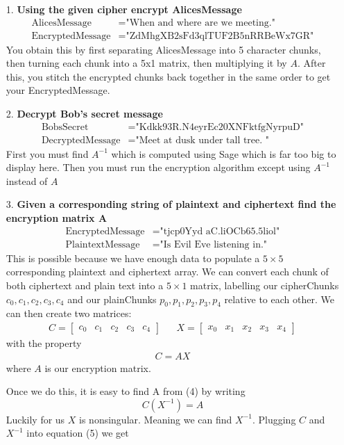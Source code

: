 \documentclass[12pt,letterpaper]{article}
\begin{document}
\begin{itemize}
    \item [1.] \textbf{Using the given cipher encrypt AlicesMessage}
    \begin{align*}
        \text{AlicesMessage} &= \text{"When and where are we meeting."}\\
        \text{EncryptedMessage} &= \text{"ZdMhgXB2sFd3qlTUF2B5nRRBeWx7GR"}
    \end{align*}
        You obtain this by first separating AlicesMessage into 5 character chunks, then turning each chunk into a 5x1 matrix, then multiplying it by $A$. After this, you stitch the encrypted chunks back together in the same order to get your EncryptedMessage.
    \item [2.] \textbf{Decrypt Bob's secret message}
        \begin{align*}
            \text{BobsSecret} &= \text{"Kdkk93R.N4eyrEc20XNFktfgNyrpuD"}\\
        \text{DecryptedMessage} &= \text{"Meet at dusk under tall tree. "}
        \end{align*}
        First you must find $A^{-1}$ which is computed using Sage which is far too big to display here. Then you must run the encryption algorithm except using $A^{-1}$ instead of $A$
         
        
    \item [3.] \textbf{Given a corresponding string of plaintext and ciphertext find the encryption matrix A}
        \begin{align*}
            \text{EncryptedMessage} &= \text{"tjcp0Yyd aC.liOCb65.5liol"}\\
            \text{PlaintextMessage} &= \text{"Is Evil Eve listening in."}
        \end{align*}
        This is possible because we have enough data to populate a $5\times 5$ corresponding plaintext and ciphertext array. We can convert each chunk of both ciphertext and plain text into a $5\times 1$ matrix, labelling our cipherChunks $c_0,c_1,c_2,c_3,c_4$ and our plainChunks $p_0,p_1,p_2,p_3,p_4$ relative to each other. We can then create two matrices:
        \begin{align*}
            C =
            \begin{bmatrix}
                c_0 & c_1 & c_2 & c_3 & c_4
            \end{bmatrix}
            && X = 
            \begin{bmatrix}
                x_0 & x_1 & x_2 & x_3 & x_4
            \end{bmatrix}
        \end{align*}
        with the property \cite{Apostols,Crypto}
        \begin{align}
            C = AX
        \end{align}
        where $A$ is our encryption matrix.
        
        Once we do this, it is easy to find A from (4) by writing
        \begin{equation}
            C(X^{-1})=A
        \end{equation}
        Luckily for us $X$ is nonsingular. Meaning we can find $X^{-1}$. Plugging $C$ and $X^{-1}$ into equation (5) we get
\end{itemize}
\end{document}
